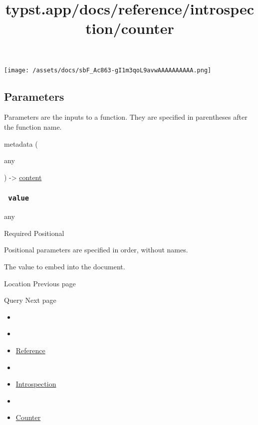 \texttt{[image: /assets/docs/sbF\_Ac863-gI1m3qoL9avwAAAAAAAAAA.png]}

\subsection{\texorpdfstring{{ Parameters
}}{ Parameters }}\label{parameters}

\label{parameters-tooltip}
Parameters are the inputs to a function. They are specified in
parentheses after the function name.

{ metadata } (

{ { any } }

) -\textgreater{} \href{/docs/reference/foundations/content/}{content}

\subsubsection{\texorpdfstring{\texttt{\ value\ }}{ value }}\label{parameters-value}

{ any }

{Required} {{ Positional }}

\label{parameters-value-positional-tooltip}
Positional parameters are specified in order, without names.

The value to embed into the document.

\href{/docs/reference/introspection/location/}{\pandocbounded{}}

{ Location } { Previous page }

\href{/docs/reference/introspection/query/}{\pandocbounded{}}

{ Query } { Next page }


\title{typst.app/docs/reference/introspection/counter}

\begin{itemize}
\tightlist
\item
  \href{/docs}{}
\item
  
\item
  \href{/docs/reference/}{Reference}
\item
  
\item
  \href{/docs/reference/introspection/}{Introspection}
\item
  
\item
  \href{/docs/reference/introspection/counter/}{Counter}
\end{itemize}

